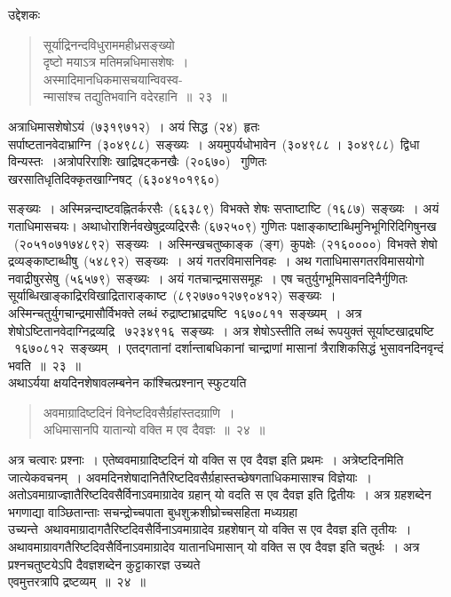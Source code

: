 \documentclass[11pt, openany]{book}
\begin{document}
उद्देशकः\textendash
\begin{quote}
{\ku सूर्याद्रिनन्दविधुराममहीध्रसङ्ख्यो\\
दृष्टो मयाऽत्र मतिमन्नधिमासशेषः~।\\
अस्मादिमानधिकमासचयान्विवस्व-\\
न्मासांश्च तद्युतिभवानि वदेरहानि~॥~२३~॥}
\end{quote}

\indent
अत्राधिमासशेषोऽयं~(७३१९७१२)~। अयं सिद्ध~(२४)~हृतः सर्पाष्टतानवेदाभ्राग्नि~(३०४९८८)~सङ्ख्यः~। अयमुपर्यधोभावेन~(३०४९८८ । ३०४९८८)~द्विधा विन्यस्तः~।अत्रोपरिराशिः खाद्रिषट्कनखैः~(२०६७०)~ गुणितः खरसातिधृतिदिक्कृतखाग्निषट्~(६३०४१०१९६०)~


\newpage
\thispagestyle{fancy}
\fancyhf{}

\noindent
सङ्ख्यः~। अस्मिन्नन्दाष्टवह्नितर्करसैः~(६६३८९)~विभक्ते शेषः सप्ताष्टाष्टि~(१६८७)~सङ्ख्यः~। अयं गताधिमासचयः। अथाधोराशिर्नवखेषुद्रव्यद्रिरसैः (६७२५०९) गुणितः पक्षाङ्काष्टाब्धिमुनिभूगिरिदिगिषुनख ~(२०५१०७१७४८९२)~सङ्ख्यः~। अस्मिन्खचतुष्काङ्क~(ङ्ग)~कुपक्षेः~(२१६००००)~विभक्ते शेषो द्रव्यङ्काष्टाब्धीषु~(५४८९२)~सङ्ख्यः~। अयं गतरविमासनिवहः~। अथ गताधिमासगतरविमासयोगो नवाद्रीषुरसेषु~(५६५७९)~सङ्ख्यः~। अयं गतचान्द्रमाससमूहः~। एष चतुर्युगभूमिसावनदिनैर्गुणितः सूर्याब्धिखाङ्काद्रिरविखाद्रिताराङ्काष्ट~(८९२७७०१२७९०४१२)~सङ्ख्यः~। अस्मिन्चतुर्युगचान्द्रमासौर्विभक्ते लब्धं रुद्राष्टाभ्राद्र्यष्टि~१६७०८११~सङ्ख्यम्~। अत्र शेषोऽष्टितानवेदाग्निद्रव्यद्रि
~७२३४९१६~सङ्ख्यः~। अत्र शेषोऽस्तीति लब्धं रूपयुक्तं सूर्याष्टखाद्र्यष्टि
~१६७०८१२~सङ्ख्यम्~। एतद्गतानां दर्शान्ताबधिकानां चान्द्राणां मासानां त्रैराशिकसिद्धं भुसावनदिनवृन्दं भवति~॥~२३~॥\\

\indent
अथाऽर्यया क्षयदिनशेषावलम्बनेन कांश्चित्प्रश्नान् स्फुटयति\textendash

\begin{quote}
{\ks अवमाग्रादिष्टदिनं विनेष्टदिवसैर्ग्रहांस्तदग्राणि~।\\
अधिमासानपि यातान्यो वक्ति म एव दैवज्ञः~॥~२४~॥}
\end{quote}

\indent
अत्र चत्वारः प्रश्नाः~। एतेष्ववमाग्रादिष्टदिनं यो वक्ति स एव दैवज्ञ इति प्रथमः~। अत्रेष्टदिनमिति जात्येकवचनम्~। अवमदिनशेषादानितैरिष्टदिवसैर्ग्रहास्तच्छेषगताधिकमासाश्च विज्ञेयाः~। अतोऽवमाग्राज्ज्ञातैरिष्टदिवसैर्विनाऽवमाग्रादेव ग्रहान् यो वदति स एव दैवज्ञ इति द्वितीयः~। अत्र ग्रहशब्देन भगणाद्या वाञ्छितान्ताः सचन्द्रोच्चपाता बुधशुक्रशीघ्रोच्चसहिता मध्यग्रहा उच्यन्ते\textendash\ अथावमाग्रादागतैरिष्टदिवसैर्विनाऽवमाग्रादेव ग्रहशेषान् यो वक्ति स एव दैवज्ञ इति तृतीयः~। अथावमाग्रावगतैरिष्टदिवसैर्विनाऽवमाग्रादेव यातानधिमासान् यो वक्ति स एव दैवज्ञ इति चतुर्थः~। अत्र प्रश्नचतुष्टयेऽपि दैवज्ञशब्देन कुट्टाकारज्ञ उच्यते\textendash\\एवमुत्तरत्रापि द्रष्टव्यम्~॥~२४~॥ \\
\end{document}
